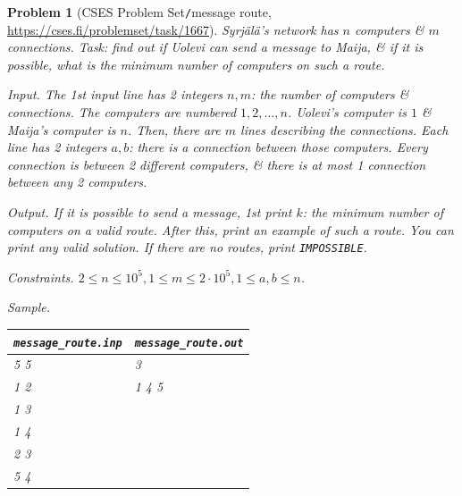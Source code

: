 \documentclass[oneside]{book}
\newtheorem{problem}{Problem}
\begin{document}
\begin{problem}[CSES Problem Set{\tt/}message route, \url{https://cses.fi/problemset/task/1667}]
	Syrjälä's network has $n$ computers \& $m$ connections. Task: find out if Uolevi can send a message to Maija, \& if it is possible, what is the minimum number of computers on such a route.
	\item {\sf Input.} The 1st input line has 2 integers $n,m$: the number of computers \& connections. The computers are numbered $1,2,\ldots,n$. Uolevi's computer is $1$ \& Maija's computer is $n$. Then, there are $m$ lines describing the connections. Each line has 2 integers $a,b$: there is a connection between those computers. Every connection is between 2 different computers, \& there is at most 1 connection between any 2 computers.
	\item {\sf Output.} If it is possible to send a message, 1st print $k$: the minimum number of computers on a valid route. After this, print an example of such a route. You can print any valid solution. If there are no routes, print {\tt IMPOSSIBLE}.
	\item {\sf Constraints.} $2\le n\le10^5,1\le m\le2\cdot10^5,1\le a,b\le n$.
	\item {\sf Sample.}
	\begin{table}[H]
		\centering
		\begin{tabular}{|l|l|}
			\hline
			\verb|message_route.inp| & \verb|message_route.out| \\
			\hline
			5 5 & 3 \\
			1 2 & 1 4 5 \\
			1 3 & \\
			1 4 & \\
			2 3 & \\
			5 4 & \\
			\hline
		\end{tabular}
	\end{table}
\end{problem}
\end{document}
